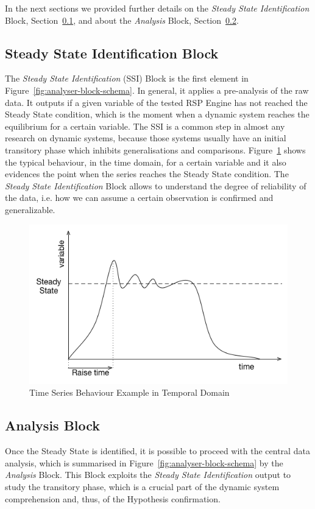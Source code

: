 In the next sections we provided further details on the \textit{Steady State Identification} Block, Section~\ref{sec:analyser-ss-block}, and about the \textit{Analysis} Block, Section~\ref{sec:analyser-analysis-block}. 

\subsection{Steady State Identification Block}\label{sec:analyser-ss-block}

The \textit{Steady State Identification} (SSI) Block is the first element in Figure~\ref{fig:analyser-block-schema}. In general, it applies a pre-analysis of the raw data. It outputs if a given variable of the tested RSP Engine has not reached the Steady State condition, which is the moment when a dynamic system reaches the equilibrium for a certain variable. The SSI is a common step in almost any research on dynamic systems, because those systems usually have an initial transitory phase which inhibits generalisations and comparisons. Figure~\ref{fig:steady-state} shows the typical behaviour, in the time domain, for a certain variable and it also evidences the point when the series reaches the Steady State condition. The \textit{Steady State Identification} Block allows to understand the degree of reliability of the data, i.e. how we can assume a certain observation is confirmed and generalizable.

\begin{figure}[h!]
  \centering
	\includegraphics[width=0.5\linewidth]{images/steady-state}
	\caption{Time Series Behaviour Example in Temporal Domain} 	
  	\label{fig:steady-state}
\end{figure}


\subsection{Analysis Block}\label{sec:analyser-analysis-block}

Once the Steady State is identified, it is possible to proceed with the central data analysis, which is summarised in Figure~\ref{fig:analyser-block-schema} by the \textit{Analysis} Block. This Block exploits the \textit{Steady State Identification} output to study the transitory phase, which is a crucial part of the dynamic system comprehension and, thus, of the Hypothesis confirmation.


